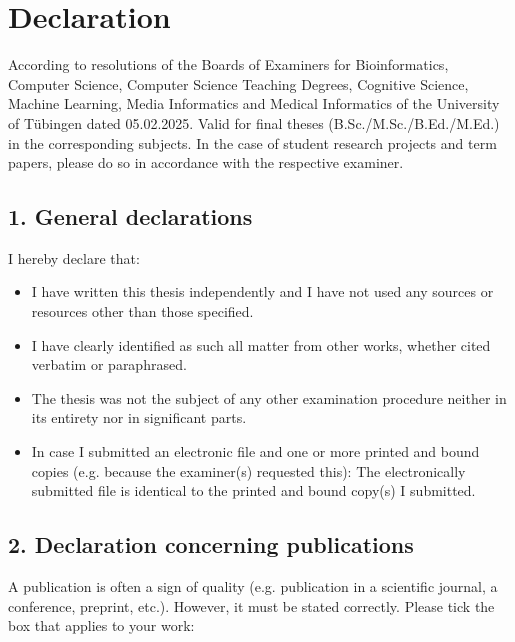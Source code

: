 \chapter*{Declaration}
\markboth{}{}
\thispagestyle{empty}

According to resolutions of the Boards of Examiners for Bioinformatics, Computer Science, Computer Science Teaching Degrees, Cognitive Science, Machine Learning, Media Informatics and Medical Informatics of the University of Tübingen dated 05.02.2025. Valid for final theses (B.Sc./M.Sc./B.Ed./M.Ed.) in the corresponding subjects. In the case of student research projects and term papers, please do so in accordance with the respective examiner.

\section*{1. General declarations}

I hereby declare that:

\begin{itemize}
    \item I have written this thesis independently and I have not used any sources or resources other than those specified.
    \item I have clearly identified as such all matter from other works, whether cited verbatim or paraphrased.
    \item The thesis was not the subject of any other examination procedure neither in its entirety nor in significant parts.
    \item In case I submitted an electronic file and one or more printed and bound copies (e.g. because the examiner(s) requested this): The electronically submitted file is identical to the printed and bound copy(s) I submitted.
\end{itemize}

\section*{2. Declaration concerning publications}

A publication is often a sign of quality (e.g. publication in a scientific journal, a conference, preprint, etc.). However, it must be stated correctly. Please tick the box that applies to your work:


